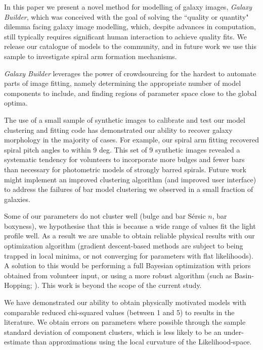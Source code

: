 \documentclass[../main.tex]{subfiles}
\begin{document}
\label{sec:conclusions}
In this paper we present a novel method for modelling of galaxy images, \textit{Galaxy Builder}, which was conceived with the goal of solving the ``quality or quantity" dilemma facing galaxy image modelling, which, despite advances in computation, still typically requires significant human interaction to achieve quality fits. We release our catalogue of models to the community, and in future work we use this sample to investigate spiral arm formation mechanisms.

\textit{Galaxy Builder} leverages the power of crowdsourcing for the hardest to automate parts of image fitting, namely determining the appropriate number of model components to include, and finding regions of parameter space close to the global optima.

The use of a small sample of synthetic images to calibrate and test our model clustering and fitting code has demonstrated our ability to recover galaxy morphology in the majority of cases. For example, our spiral arm fitting recovered spiral pitch angles to within 9 deg. This set of 9 synthetic images revealed a systematic tendency for volunteers to incorporate more bulges and fewer bars than necessary for photometric models of strongly barred spirals. Future work might implement an improved clustering algorithm (and improved user interface) to address the failures of bar model clustering we observed in a small fraction of galaxies.

Some of our parameters do not cluster well (bulge and bar S\'ersic $n$, bar boxyness), we hypothesise that this is because a wide range of values fit the light profile well. As a result we are unable to obtain reliable physical results with our optimization algorithm (gradient descent-based methods are subject to being trapped in local minima, or not converging for parameters with flat likelihoods). A solution to this would be performing a full Bayesian optimization with priors obtained from volunteer input, or using a more robust algorithm (such as Basin-Hopping; \citealt{1998cond.mat..3344W}). This work is beyond the scope of the current study.

We have demonstrated our ability to obtain physically motivated models with comparable reduced chi-squared values (between 1 and 5) to results in the literature. We obtain errors on parameters where possible through the sample standard deviation of component clusters, which is less likely to be an under-estimate than approximations using the local curvature of the Likelihood-space.
\end{document}
